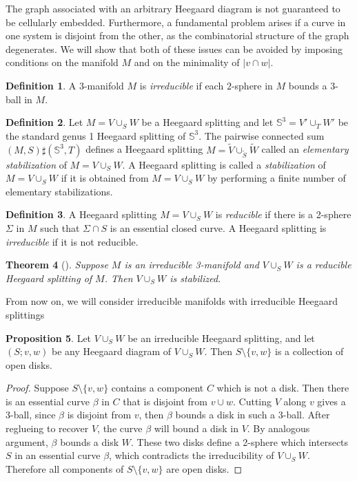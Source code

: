 \documentclass[pdflatex,sn-mathphys-num]{sn-jnl}%
\theoremstyle{plain}
\newtheorem{theorem}{Theorem}
\theoremstyle{definition}
\newtheorem{definition}[theorem]{Definition}
\newtheorem{proposition}[theorem]{Proposition}
\theoremstyle{remark}
\begin{document}
{The graph associated with an arbitrary Heegaard diagram is not guaranteed to be cellularly embedded. Furthermore, a  fundamental problem arises if a curve in one system is disjoint from the other, as the combinatorial structure of the graph degenerates. We will show that both of these issues can be avoided by imposing conditions on the manifold $M$ and on the minimality of $|v\cap w|$.}

\begin{definition}
    A $3$-manifold $M$ is \emph{irreducible} if each $2$-sphere in $M$ bounds a $3$-ball in $M$.
\end{definition}

\begin{definition}
    Let $M=V\cup _S W$ be a Heegaard splitting and let $\mathbb{S}^3= V'\cup_T W'$ be the standard genus 1 Heegaard splitting of $\mathbb{S}^3$. The pairwise connected sum $(M,S)\sharp (\mathbb{S}^3, T)$ defines a Heegaard splitting $M=\tilde{V}\cup_{\tilde{S}}\tilde{W}$ called an \emph{elementary stabilization} of $M=V\cup_S W$. A Heegaard splitting is called a \emph{stabilization} of $M=V\cup_SW$ if it is obtained from $M=V\cup_SW$ by performing a finite number of elementary stabilizations.
\end{definition}

\begin{definition}
    A Heegaard splitting $M=V\cup _S W$ is \emph{reducible} if there is a 2-sphere $\Sigma$ in $M$ such that $\Sigma \cap S$ is an essential closed curve. A Heegaard splitting is \emph{irreducible} if it is not reducible. 
\end{definition}

\begin{theorem}[\cite{Scharlemann}]\label{theo:redicibleimpliesstab}
    Suppose $M$ is an irreducible 3-manifold and $V\cup _S W$ is a reducible Heegaard splitting of $M$. Then $V\cup _S W$ is stabilized.
\end{theorem}
%

From now on, we will consider irreducible manifolds with irreducible Heegaard splittings

\begin{proposition}\label{prop:irredHeegSplitiscellular}
    Let $V\cup_S W$ be an irreducible Heegaard splitting, and let $(S; v, w)$ be any Heegaard diagram of $V\cup_S W$. Then $S\setminus \{v,w\}$ is a collection of open disks.
\begin{proof}
    Suppose $S\setminus \{v,w\}$ contains a component $C$ which is not a disk. Then there is an essential curve $\beta$ in  $C$ that is disjoint from $v\cup w$. Cutting $V$ along $v$ gives a 3-ball, since $\beta$ is disjoint from $v$, then $\beta$ bounds a disk in such a 3-ball. After reglueing to recover $V$, the curve $\beta$ will bound a disk in $V$. By analogous argument, $\beta$ bounds a disk  $W$. These two disks define a 2-sphere which intersects $S$ in an essential curve $\beta$, which contradicts the irreducibility of $V\cup_S W$. Therefore all components of $S\setminus \{v,w\}$ are open disks. 
\end{proof}
\end{proposition}
\end{document}
